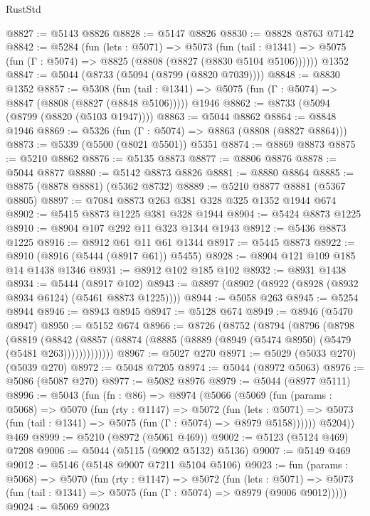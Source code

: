 \begin{lexlean}{RustStd}
\begin{coremodule}
@8827 := @5143 @8826
@8828 := @5147 @8826
@8830 := @8828 @8763 @7142
@8842 := @5284
    (fun (lets : @5071) =>
    @5073
      (fun (tail : @1341) => @5075 (fun (Γ : @5074) => @8825 (@8808 (@8827 (@8830 @5104 @5106))))))
    @1352
@8847 := @5044 (@8733 (@5094 (@8799 (@8820 @7039))))
@8848 := @8830 @1352
@8857 := @5308
    (fun (tail : @1341) => @5075 (fun (Γ : @5074) => @8847 (@8808 (@8827 (@8848 @5106)))))
    @1946
@8862 := @8733 (@5094 (@8799 (@8820 (@5103 @1947))))
@8863 := @5044 @8862
@8864 := @8848 @1946
@8869 := @5326 (fun (Γ : @5074) => @8863 (@8808 (@8827 @8864)))
@8873 := @5339 (@5500 (@8021 @5501)) @5351
@8874 := @8869 @8873
@8875 := @5210 @8862
@8876 := @5135 @8873
@8877 := @8806 @8876
@8878 := @5044 @8877
@8880 := @5142 @8873 @8826
@8881 := @8880 @8864
@8885 := @8875 (@8878 @8881) (@5362 @8732)
@8889 := @5210 @8877 @8881 (@5367 @8805)
@8897 := @7084 @8873 @263 @381 @328 @325 @1352 @1944 @674
@8902 := @5415 @8873 @1225 @381 @328 @1944
@8904 := @5424 @8873 @1225
@8910 := @8904 @107 @292 @11 @323 @1344 @1943
@8912 := @5436 @8873 @1225
@8916 := @8912 @61 @11 @61 @1344
@8917 := @5445 @8873
@8922 := @8910 (@8916 (@5444 (@8917 @61)) @5455)
@8928 := @8904 @121 @109 @185 @14 @1438 @1346
@8931 := @8912 @102 @185 @102
@8932 := @8931 @1438
@8934 := @5444 (@8917 @102)
@8943 := @8897 (@8902 (@8922 (@8928 (@8932 @8934 @6124) (@5461 @8873 @1225))))
@8944 := @5058 @263
@8945 := @5254 @8944
@8946 := @8943 @8945
@8947 := @5128 @674
@8949 := @8946 (@5470 @8947)
@8950 := @5152 @674
@8966 := @8726
    (@8752
      (@8794
        (@8796
          (@8798
            (@8819
              (@8842
                (@8857 (@8874 (@8885 (@8889 (@8949 (@5474 @8950) (@5479 (@5481 @263)))))))))))))
@8967 := @5027 @270
@8971 := @5029 (@5033 @270) (@5039 @270)
@8972 := @5048 @7205
@8974 := @5044 (@8972 @5063)
@8976 := @5086 (@5087 @270)
@8977 := @5082 @8976
@8979 := @5044 (@8977 @5111)
@8996 := @5043
    (fun (fn : @86) =>
    @8974
      (@5066
        (@5069
          (fun (params : @5068) =>
          @5070
            (fun (rty : @1147) =>
            @5072
              (fun (lets : @5071) =>
              @5073 (fun (tail : @1341) => @5075 (fun (Γ : @5074) => @8979 @5158))))))
        @5204))
    @469
@8999 := @5210 (@8972 (@5061 @469))
@9002 := @5123 (@5124 @469) @7208
@9006 := @5044 (@5115 (@9002 @5132) @5136)
@9007 := @5149 @469
@9012 := @5146 (@5148 @9007 @7211 @5104 @5106)
@9023 := fun (params : @5068) =>
  @5070
    (fun (rty : @1147) =>
    @5072
      (fun (lets : @5071) =>
      @5073 (fun (tail : @1341) => @5075 (fun (Γ : @5074) => @8979 (@9006 @9012)))))
@9024 := @5069 @9023

\end{coremodule}
\end{lexlean}

